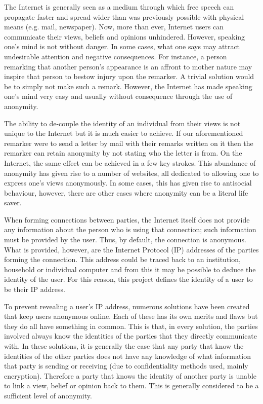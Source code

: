 \documentclass[ %
                    author={Luke Murray},
                supervisor={Dr. Simon Hollis},
                     title={Shadow Peer-to-Peer Networks},
                  subtitle={},
                    degree={MEng},
                      year={2013} ]{thesis}
\begin{document}

The Internet is generally seen as a medium through which free speech can propagate faster and spread wider than was previously possible with physical means (e.g. mail, newspaper). Now, more than ever, Internet users can communicate their views, beliefs and opinions unhindered. However, speaking one's mind is not without danger. In some cases, what one says may attract undesirable attention and negative consequences. For instance, a person remarking that another person's appearance is an affront to mother nature may inspire that person to bestow injury upon the remarker. A trivial solution would be to simply not make such a remark. However, the Internet has made speaking one's mind very easy and usually without consequence through the use of anonymity.

The ability to de-couple the identity of an individual from their views is not unique to the Internet but it is much easier to achieve. If our aforementioned remarker were to send a letter by mail with their remarks written on it then the remarker can retain anonymity by not stating who the letter is from. On the Internet, the same effect can be achieved in a few key strokes. This abundance of anonymity has given rise to a number of websites, all dedicated to allowing one to express one's views anonymously. In some cases, this has given rise to antisocial behaviour, however, there are other cases where anonymity can be a literal life saver.

When forming connections between parties, the Internet itself does not provide any information about the person who is using that connection; such information must be provided by the user. Thus, by default, the connection is anonymous. What is provided, however, are the Internet Protocol (IP) addresses of the parties forming the connection. This address could be traced back to an institution, household or individual computer and from this it may be possible to deduce the identity of the user. For this reason, this project defines the identity of a user to be their IP address.

To prevent revealing a user's IP address, numerous solutions have been created that keep users anonymous online. Each of these has its own merits and flaws but they do all have something in common. This is that, in every solution, the parties involved always know the identities of the parties that they directly communicate with. In these solutions, it is generally the case that any party that know the identities of the other parties does not have any knowledge of what information that party is sending or receiving (due to confidentiality methods used, mainly encryption). Therefore a party that knows the identity of another party is unable to link a view, belief or opinion back to them. This is generally considered to be a sufficient level of anonymity.
\end{document}
